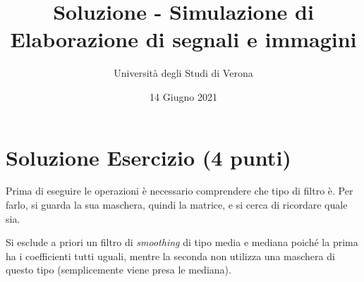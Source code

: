 \documentclass[a4paper]{article}
\begin{document}
	\author{Università degli Studi di Verona}
	\title{Soluzione - Simulazione di Elaborazione di segnali e immagini}
	\date{{\Large 14 Giugno 2021}}
	\maketitle
	
	\section{Soluzione Esercizio (4 punti)}
	
	Prima di eseguire le operazioni è necessario comprendere che tipo di filtro è. Per farlo, si guarda la sua maschera, quindi la matrice, e si cerca di ricordare quale sia.\newline
	
	\noindent
	Si esclude a priori un filtro di \emph{smoothing} di tipo media e mediana poiché la prima ha i coefficienti tutti uguali, mentre la seconda non utilizza una maschera di questo tipo (semplicemente viene presa le mediana).\newline
	
\end{document}
